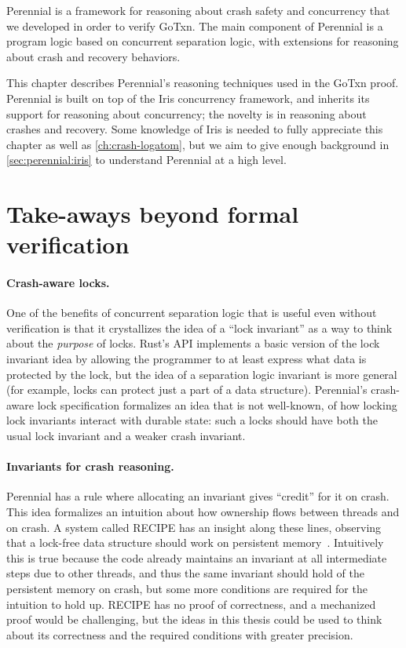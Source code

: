 Perennial is a framework for reasoning about crash safety and concurrency that
we developed in order to verify GoTxn. The main component of Perennial is a
program logic based on concurrent separation logic, with extensions for
reasoning about crash and recovery behaviors.

This chapter describes Perennial's reasoning techniques used in the GoTxn proof.
Perennial is built on top of the Iris concurrency framework, and inherits its
support for reasoning about concurrency; the novelty is in reasoning about
crashes and recovery. Some knowledge of Iris is needed to fully appreciate this
chapter as well as \cref{ch:crash-logatom}, but we aim to give enough background
in \cref{sec:perennial:iris} to understand Perennial at a high level.





\section{Take-aways beyond formal verification}

\paragraph{Crash-aware locks.} One of the benefits of concurrent separation
logic that is useful even without verification is that it crystallizes the idea
of a ``lock invariant'' as a way to think about the \emph{purpose} of locks.
Rust's  API implements a basic version of the lock invariant
idea by allowing the programmer to at least express what data is protected by
the lock, but the idea of a separation logic invariant is more general (for
example, locks can protect just a part of a data structure). Perennial's
crash-aware lock specification formalizes an idea that is not well-known, of how
locking lock invariants interact with durable state: such a locks should have
both the usual lock invariant and a weaker crash invariant.

\paragraph{Invariants for crash reasoning.} Perennial has a rule where
allocating an invariant gives ``credit'' for it on crash. This idea formalizes
an intuition about how ownership flows between threads and on crash. A system
called RECIPE has an insight along these lines, observing that a lock-free data
structure should work on persistent memory~\cite{lee:recipe}. Intuitively this
is true because the code already maintains an invariant at all intermediate
steps due to other threads, and thus the same invariant should hold of the
persistent memory on crash, but some more conditions are required for the
intuition to hold up. RECIPE has no proof of correctness, and a mechanized proof
would be challenging, but the ideas in this thesis could be used to think about
its correctness and the required conditions with greater precision.
